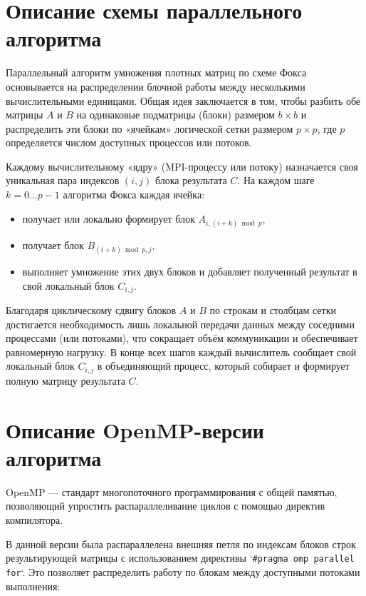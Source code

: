 \documentclass[14pt,a4paper]{extarticle}
\begin{document}
\section{Описание схемы параллельного алгоритма}

Параллельный алгоритм умножения плотных матриц по схеме Фокса основывается на распределении блочной работы между несколькими вычислительными единицами. Общая идея заключается в том, чтобы разбить обе матрицы \(A\) и \(B\) на одинаковые подматрицы (блоки) размером \(b \times b\) и распределить эти блоки по «ячейкам» логической сетки размером \(p \times p\), где \(p\) определяется числом доступных процессов или потоков.  

Каждому вычислительному «ядру» (MPI-процессу или потоку) назначается своя уникальная пара индексов \((i,j)\) блока результата \(C\). На каждом шаге \(k=0\dots p-1\) алгоритма Фокса каждая ячейка:
\begin{itemize}
  \item получает или локально формирует блок \(A_{i,(i+k)\bmod p}\),
  \item получает блок \(B_{(i+k)\bmod p,j}\),
  \item выполняет умножение этих двух блоков и добавляет полученный результат в свой локальный блок \(C_{i,j}\).
\end{itemize}

Благодаря циклическому сдвигу блоков \(A\) и \(B\) по строкам и столбцам сетки достигается необходимость лишь локальной передачи данных между соседними процессами (или потоками), что сокращает объём коммуникации и обеспечивает равномерную нагрузку. В конце всех шагов каждый вычислитель сообщает свой локальный блок \(C_{i,j}\) в объединяющий процесс, который собирает и формирует полную матрицу результата \(C\).
\newpage

\section{Описание OpenMP-версии алгоритма}

OpenMP — стандарт многопоточного программирования с общей памятью, позволяющий упростить распараллеливание циклов с помощью директив компилятора.

В данной версии была распараллелена внешняя петля по индексам блоков строк результирующей матрицы с использованием директивы `\texttt{\#pragma omp parallel for}`. Это позволяет распределить работу по блокам между доступными потоками выполнения:
\end{document}
